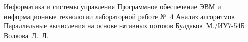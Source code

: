 \documentclass{bmstu}[a4paper]
\begin{document}
\makereporttitle
{Информатика и системы управления} %
{Программное обеспечение ЭВМ и информационные технологии} %
{лабораторной работе №~4} %
{Анализ алгоритмов} %
{Параллельные вычисления на основе нативных потоков} %
{} %
{Булдаков~М./ИУ7-54Б} %
{Волкова~Л.~Л.} %

\maketableofcontents





% 
% 


\makebibliography

%
\end{document}
